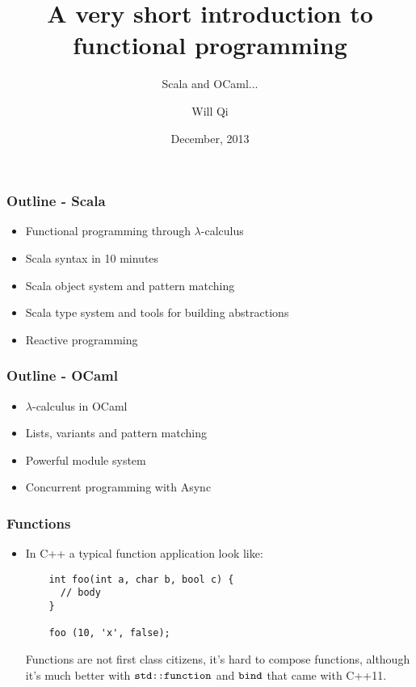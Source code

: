 \documentclass[handout]{beamer}
\title{A very short introduction to functional programming}
\subtitle{Scala and OCaml...}
\author{Will Qi}
\date{December, 2013}
\begin{document}
\maketitle

\begin{frame}
  \frametitle{Outline - Scala}
  \begin{itemize}
  \item Functional programming through $\lambda$-calculus
    \pause
  \item Scala syntax in 10 minutes
    \pause
  \item Scala object system and pattern matching
    \pause
  \item Scala type system and tools for building abstractions
    \pause
    \item Reactive programming
  \end{itemize}
\end{frame}

\begin{frame}
  \frametitle{Outline - OCaml}
  \begin{itemize}
    \item $\lambda$-calculus in OCaml
      \pause
    \item Lists, variants and pattern matching
      \pause
    \item Powerful module system
      \pause
    \item Concurrent programming with Async
  \end{itemize}
\end{frame}

\begin{frame}[fragile]
  \frametitle{Functions}
  \begin{itemize}
  \item In C++ a typical function application look like:
    \begin{verbatim}
    int foo(int a, char b, bool c) {
      // body
    }

    foo (10, 'x', false);
    \end{verbatim}

    \pause
    Functions are not first class citizens, it's hard to compose functions, although it's much better with $\verb|std::function|$
    and $\verb|bind|$ that came with C++11.
  \end{itemize}
\end{frame}
\end{document}
